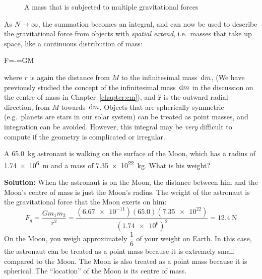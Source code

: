 \begin{figure}[b]
  \centering
  \caption{A mass that is subjected to multiple gravitational forces}
  \label{fig:multiple-masses}
\end{figure}

As $N\to\infty$, the summation becomes an integral, and can now be used to
describe the gravitational force from objects with \emph{spatial extend},
i.e.\ masses that take up space, like a continuous distribution of mass:
\begin{important-equation}
  \bm F=-\int{}=GM\int{}
  \label{eq:integral-grav-force}
\end{important-equation}
where $r$ is again the distance from $M$ to the infinitesimal mass $\dl m$,
(We have previously studied the concept of the infinitesimal mass $\dl m$ in
the discussion on the centre of mass in Chapter~\ref{chapter:cm}), and
$\hat{\bm r}$ is the outward radial direction, from $M$ towards $\dl m$.
Objects that are spherically symmetric (e.g.\ planets are stars in our
solar system) can be treated as point masses, and integration can be avoided.
However, this integral may be \emph{very} difficult to compute if the geometry
is complicated or irregular.

\begin{example}
  A \SI{65.0}{\kilo\gram} astronaut is walking on the surface of the Moon,
  which has a radius of \SI{1.74e6}{\metre} and a mass of
  \SI{7.35e22}{\kilo\gram}. What is his weight?

  \textbf{Solution:} When the astronaut is on the Moon, the distance between
  him and the Moon's centre of mass is just the Moon's radius. The weight of
  the astronaut is the gravitational force that the Moon exerts on him:
  \begin{equation*}
    F_g=\frac{Gm_1m_2}{r^2}
    =\frac{(\num{6.67e-11})(65.0)(\num{7.35e22})}{(\num{1.74e6})^2}
    =\SI{12.4}\newton
  \end{equation*}
  On the Moon, you weigh approximately $\dfrac 16$ of your weight on Earth.
  In this case, the astronaut can be treated as a point mass because it is
  extremely small compared to the Moon. The Moon is also treated as a point
  mass because it is spherical. The ``location'' of the Moon is its centre of
  mass.
\end{example}

